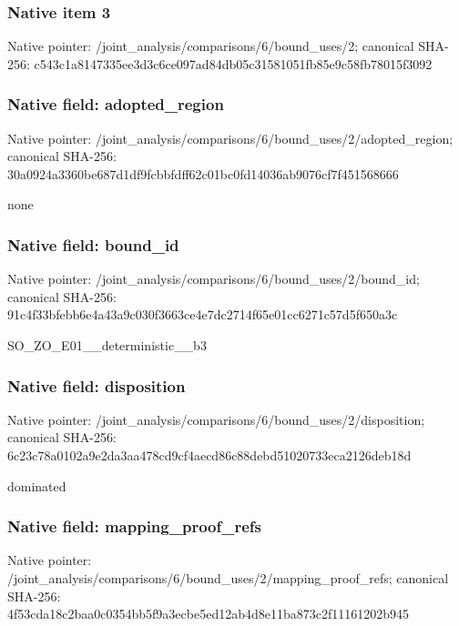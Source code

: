\documentclass[10pt,a4paper]{article}
\begin{document}
\subsubsection{Native item 3}
Native pointer: /joint\_\allowbreak{}analysis/comparisons/6/bound\_\allowbreak{}uses/2; canonical SHA-256: c543c1a8147335ee3d3c6ce097ad84db05c31581051fb85e9c58fb78015f3092

\subsubsection{Native field: adopted\_\allowbreak{}region}
Native pointer: /joint\_\allowbreak{}analysis/comparisons/6/bound\_\allowbreak{}uses/2/adopted\_\allowbreak{}region; canonical SHA-256: 30a0924a3360be687d1df9fcbbfdff62c01bc0fd14036ab9076cf7f451568666

\begingroup\raggedright\sloppy none\par\endgroup

\subsubsection{Native field: bound\_\allowbreak{}id}
Native pointer: /joint\_\allowbreak{}analysis/comparisons/6/bound\_\allowbreak{}uses/2/bound\_\allowbreak{}id; canonical SHA-256: 91c4f33bfebb6e4a43a9c030f3663ce4e7dc2714f65e01cc6271c57d5f650a3c

\begingroup\raggedright\sloppy SO\_\allowbreak{}ZO\_\allowbreak{}E01\_\allowbreak{}\_\allowbreak{}deterministic\_\allowbreak{}\_\allowbreak{}b3\par\endgroup

\subsubsection{Native field: disposition}
Native pointer: /joint\_\allowbreak{}analysis/comparisons/6/bound\_\allowbreak{}uses/2/disposition; canonical SHA-256: 6c23c78a0102a9e2da3aa478cd9cf4aecd86c88debd51020733eca2126deb18d

\begingroup\raggedright\sloppy dominated\par\endgroup

\subsubsection{Native field: mapping\_\allowbreak{}proof\_\allowbreak{}refs}
Native pointer: /joint\_\allowbreak{}analysis/comparisons/6/bound\_\allowbreak{}uses/2/mapping\_\allowbreak{}proof\_\allowbreak{}refs; canonical SHA-256: 4f53cda18c2baa0c0354bb5f9a3ecbe5ed12ab4d8e11ba873c2f11161202b945
\end{document}
